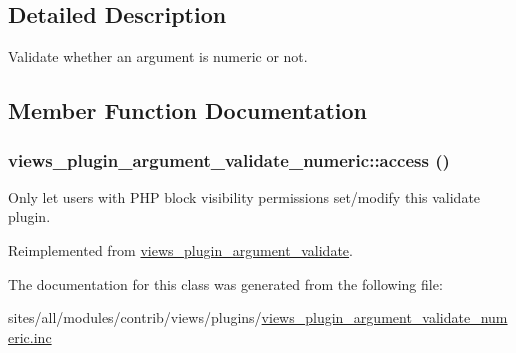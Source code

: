 \subsection{Detailed Description}
Validate whether an argument is numeric or not. 

\subsection{Member Function Documentation}
\hypertarget{classviews__plugin__argument__validate__numeric_fa33dbc88c165f2505c5fdf1c9263b8f}{
\subsubsection[{access}]{\setlength{\rightskip}{0pt plus 5cm}views\_\-plugin\_\-argument\_\-validate\_\-numeric::access ()}}
\label{classviews__plugin__argument__validate__numeric_fa33dbc88c165f2505c5fdf1c9263b8f}


Only let users with PHP block visibility permissions set/modify this validate plugin. 

Reimplemented from \hyperlink{classviews__plugin__argument__validate_b90c095a5a91dcf8dfae02dc975d974e}{views\_\-plugin\_\-argument\_\-validate}.

The documentation for this class was generated from the following file:\begin{CompactItemize}
\item 
sites/all/modules/contrib/views/plugins/\hyperlink{views__plugin__argument__validate__numeric_8inc}{views\_\-plugin\_\-argument\_\-validate\_\-numeric.inc}\end{CompactItemize}
